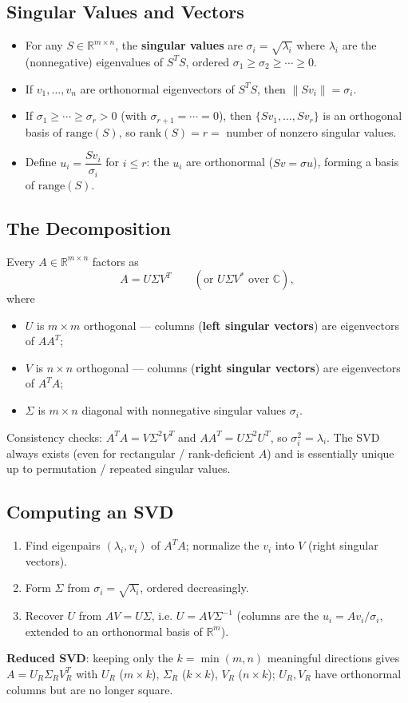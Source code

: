 \documentclass[hidelinks]{article}
\begin{document}
\subsection{Singular Values and Vectors}
\begin{itemize}
    \item For any $S\in\mathbb{R}^{m\times n}$, the \textbf{singular values} are $\sigma_i = \sqrt{\lambda_i}$ where $\lambda_i$ are the (nonnegative) eigenvalues of $S^TS$, ordered $\sigma_1\ge\sigma_2\ge\cdots\ge 0$.
    \item If $v_1,\ldots,v_n$ are orthonormal eigenvectors of $S^TS$, then $\|Sv_i\| = \sigma_i$.
    \item If $\sigma_1\ge\cdots\ge\sigma_r > 0$ (with $\sigma_{r+1}=\cdots=0$), then $\{Sv_1,\ldots,Sv_r\}$ is an orthogonal basis of $\mathrm{range}(S)$, so $\mathrm{rank}(S) = r =$ number of nonzero singular values.
    \item Define $u_i = \dfrac{Sv_i}{\sigma_i}$ for $i\le r$: the $u_i$ are orthonormal ($Sv = \sigma u$), forming a basis of $\mathrm{range}(S)$.
\end{itemize}

\subsection{The Decomposition}
Every $A\in\mathbb{R}^{m\times n}$ factors as
\[
    A = U\Sigma V^T \qquad (\text{or } U\Sigma V^{*}\text{ over }\mathbb{C}),
\]
where
\begin{itemize}
    \item $U$ is $m\times m$ orthogonal — columns (\textbf{left singular vectors}) are eigenvectors of $AA^T$;
    \item $V$ is $n\times n$ orthogonal — columns (\textbf{right singular vectors}) are eigenvectors of $A^TA$;
    \item $\Sigma$ is $m\times n$ diagonal with nonnegative singular values $\sigma_i$.
\end{itemize}
Consistency checks: $A^TA = V\Sigma^2 V^T$ and $AA^T = U\Sigma^2 U^T$, so $\sigma_i^2 = \lambda_i$. The SVD always exists (even for rectangular / rank-deficient $A$) and is essentially unique up to permutation / repeated singular values.

\subsection{Computing an SVD}
\begin{enumerate}
    \item Find eigenpairs $(\lambda_i, v_i)$ of $A^TA$; normalize the $v_i$ into $V$ (right singular vectors).
    \item Form $\Sigma$ from $\sigma_i = \sqrt{\lambda_i}$, ordered decreasingly.
    \item Recover $U$ from $AV = U\Sigma$, i.e. $U = AV\Sigma^{-1}$ (columns are the $u_i = Av_i/\sigma_i$, extended to an orthonormal basis of $\mathbb{R}^m$).
\end{enumerate}
\textbf{Reduced SVD}: keeping only the $k=\min(m,n)$ meaningful directions gives $A = U_R\Sigma_R V_R^T$ with $U_R$ ($m\times k$), $\Sigma_R$ ($k\times k$), $V_R$ ($n\times k$); $U_R, V_R$ have orthonormal columns but are no longer square.
\end{document}
